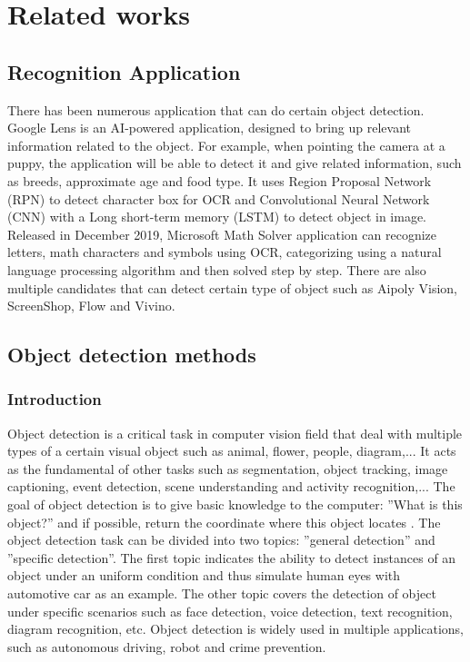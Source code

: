 \chapter{Related works} \label{chap:survey}

\section{Recognition Application}
There has been numerous application that can do certain object detection. Google Lens is an AI-powered application, designed to bring up relevant information related to the object. For example, when pointing the camera at a puppy, the application will be able to detect it and give related information, such as breeds, approximate age and food type. It uses Region Proposal Network (RPN) to detect character box for OCR and Convolutional Neural Network (CNN) with a Long short-term memory (LSTM) to detect object in image. Released in December 2019, Microsoft Math Solver application can recognize letters, math characters and symbols using OCR, categorizing using a natural language processing algorithm and then solved step by step. There are also multiple candidates that can detect certain type of object such as Aipoly Vision, ScreenShop, Flow and Vivino.

\section{Object detection methods}
\subsection{Introduction}
Object detection is a critical task in computer vision field that deal with multiple types of a certain visual object such as animal, flower, people, diagram,... It acts as the fundamental of other tasks such as segmentation, object tracking, image captioning, event detection, scene understanding and activity recognition,... The goal of object detection is to give basic knowledge to the computer: ''What is this object?'' and if possible, return the coordinate where this object locates . The object detection task can be divided into two topics: ''general detection'' and ''specific detection''. The first topic indicates the ability to detect instances of an object under an uniform condition and thus simulate human eyes with automotive car as an example. The other topic covers the detection of object under specific scenarios such as face detection, voice detection, text recognition, diagram recognition, etc. Object detection is widely used in multiple applications, such as autonomous driving, robot and crime prevention.

